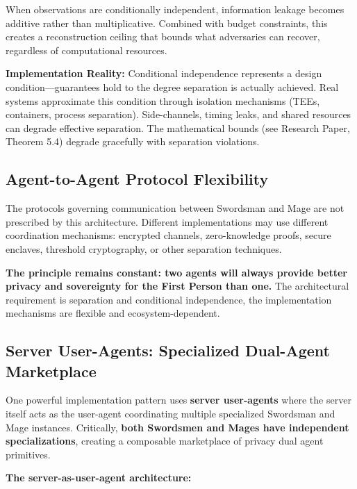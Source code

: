\documentclass[
  11pt,
]{article}
\begin{document}
When observations are conditionally independent, information leakage
becomes additive rather than multiplicative. Combined with budget
constraints, this creates a reconstruction ceiling that bounds what
adversaries can recover, regardless of computational resources.

\textbf{Implementation Reality:} Conditional independence represents a
design condition---guarantees hold to the degree separation is actually
achieved. Real systems approximate this condition through isolation
mechanisms (TEEs, containers, process separation). Side-channels, timing
leaks, and shared resources can degrade effective separation. The
mathematical bounds (see Research Paper, Theorem 5.4) degrade gracefully
with separation violations.

\subsection{Agent-to-Agent Protocol
Flexibility}\label{agent-to-agent-protocol-flexibility}

The protocols governing communication between Swordsman and Mage are not
prescribed by this architecture. Different implementations may use
different coordination mechanisms: encrypted channels, zero-knowledge
proofs, secure enclaves, threshold cryptography, or other separation
techniques.

\textbf{The principle remains constant: two agents will always provide
better privacy and sovereignty for the First Person than one.} The
architectural requirement is separation and conditional independence,
the implementation mechanisms are flexible and ecosystem-dependent.

\subsection{Server User-Agents: Specialized Dual-Agent
Marketplace}\label{server-user-agents-specialized-dual-agent-marketplace}

One powerful implementation pattern uses \textbf{server user-agents}
where the server itself acts as the user-agent coordinating multiple
specialized Swordsman and Mage instances. Critically, \textbf{both
Swordsmen and Mages have independent specializations}, creating a
composable marketplace of privacy dual agent primitives.

\textbf{The server-as-user-agent architecture:}
\end{document}
